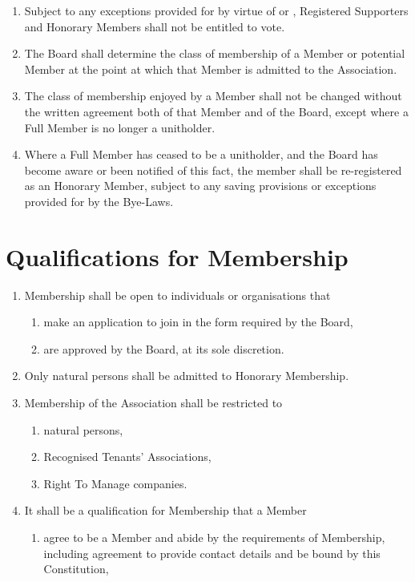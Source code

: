 \documentclass[10pt]{mk-articles-of-association}
\newcommand{\mysection}[1]{
  \end{enumerate}
  \section*{#1}
  \begin{enumerate}[resume]
}
\newcommand{\EC}[0]{Board}
\newcommand{\Exec}[0]{\EC{} }
\newcommand{\RTA}[0]{Recognised Tenants' Association}
\begin{document}
\begin{enumerate}
  \item Subject to any exceptions provided for by virtue of
     or ,
    Registered Supporters and
    Honorary Members shall not be entitled to vote.

  \item The \Exec shall determine the class of membership of a Member
    or potential Member at the point at which that Member is admitted
    to the Association.

  \item The class of membership enjoyed by a Member
    shall not be changed without the written agreement both of that
    Member and of the \EC{}, except where a Full Member is no
    longer a unitholder.

  \item Where a Full Member has ceased to be a unitholder, and the
    \Exec has become aware or been notified of this fact, the member
    shall be re-registered as an Honorary Member, subject to any
    saving provisions or exceptions provided for by the Bye-Laws.


\mysection{Qualifications for Membership}

  \item Membership shall be open to individuals or organisations that
    \begin{enumerate}
      \item make an application to join in the form required by the \EC, \ITand
      \item are approved by the \EC{}, at its sole discretion.
    \end{enumerate}

  \item Only natural persons shall be admitted to Honorary Membership.

  \item Membership of the Association shall be restricted to
    \begin{enumerate}
    \item natural persons,
    \item \RTA{}s, \ITand
    \item Right To Manage companies.
    \end{enumerate}

  \item It shall be a qualification for Membership that a Member
    \begin{enumerate}

    \item agree to be a Member and abide by the requirements of
      Membership, including agreement to provide contact details and
      be bound by this Constitution,


\end{enumerate}
\end{enumerate}
\end{document}
